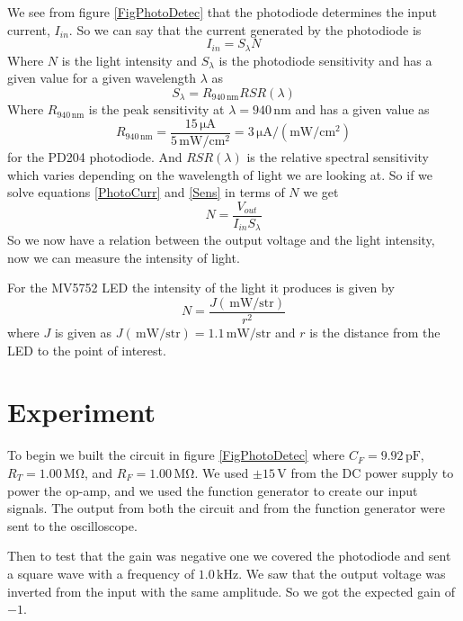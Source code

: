 \documentclass[11pt]{article}
\numberwithin{equation}{section}
\numberwithin{figure}{section}
\numberwithin{table}{section}
\newcommand{\unit}[1]{\ensuremath{\, \mathrm{#1}}}
\begin{document}
We see from figure \ref{FigPhotoDetec} that the photodiode determines the input current, $I_{in}$. So we can say that the current generated by the photodiode is
\begin{equation}
I_{in} = S_{\lambda}N
\label{PhotoCurr}
\end{equation}
Where $N$ is the light intensity and $S_{\lambda}$ is the photodiode sensitivity and has a given value for a given wavelength $\lambda$ as
\begin{equation}
S_{\lambda} = R_{940\unit{nm}}RSR(\lambda)
\label{Sens}
\end{equation}
Where $R_{940\unit{nm}}$ is the peak sensitivity at $\lambda = 940\unit{nm}$ and has a given value as
$$R_{940\unit{nm}} = \frac{15\unit{\mu A}}{5\unit{mW/cm^2}} = 3\unit{\mu A/(mW/cm^2)}$$
for the PD204 photodiode. And $RSR(\lambda)$ is the relative spectral sensitivity which varies depending on the wavelength of light we are looking at. So if we solve equations \ref{PhotoCurr} and \ref{Sens} in terms of $N$ we get
\begin{equation}
N = \frac{V_{out}}{I_{in}S_{\lambda}}
\label{LightInten}
\end{equation}
So we now have a relation between the output voltage and the light intensity, now we can measure the intensity of light. 

For the MV5752 LED the intensity of the light it produces is given by
\begin{equation}
N = \frac{J(\unit{mW/str})}{r^2}
\label{LED}
\end{equation}
where $J$ is given as $J(\unit{mW/str}) = 1.1\unit{mW/str}$ and $r$ is the distance from the LED to the point of interest.

\section{Experiment}
To begin we built the circuit in figure \ref{FigPhotoDetec} where $C_F = 9.92\unit{pF}$, $R_T = 1.00\unit{M\Omega}$, and $R_F = 1.00\unit{M\Omega}$. We used $\pm15\unit{V}$ from the DC power supply to power the op-amp, and we used the function generator to create our input signals. The output from both the circuit and from the function generator were sent to the oscilloscope.

Then to test that the gain was negative one we covered the photodiode and sent a square wave with a frequency of $1.0\unit{kHz}$. We saw that the output voltage was inverted from the input with the same amplitude. So we got the expected gain of $-1$. 
\end{document}
